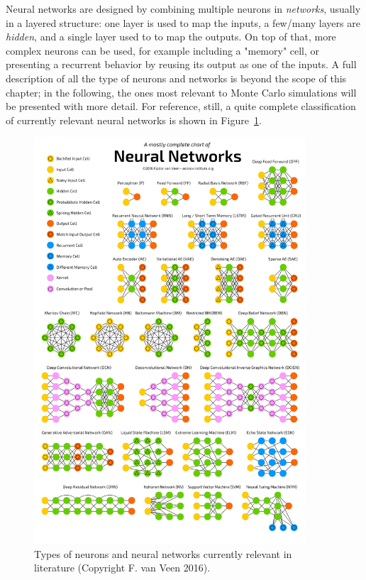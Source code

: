 Neural networks are designed by combining multiple neurons in \emph{networks}, usually in a layered structure: one layer is used to map the inputs, a few/many layers are \emph{hidden}, and a single layer used to to map the outputs. On top of that, more complex neurons can be used, for example including a "memory" cell, or presenting a recurrent behavior by reusing its output as one of the inputs. A full description of all the type of neurons and networks is beyond the scope of this chapter; in the following, the ones most relevant to Monte Carlo simulations will be presented with more detail. For reference, still, a quite complete classification of currently relevant neural networks is shown in Figure~\ref{fig:types}.
\begin{figure}[h]
    \centering
    \includegraphics[width=0.9\textwidth]{images/types.png}
    \caption{Types of neurons and neural networks currently relevant in literature (Copyright F. van Veen 2016).}
    \label{fig:types}
\end{figure}

